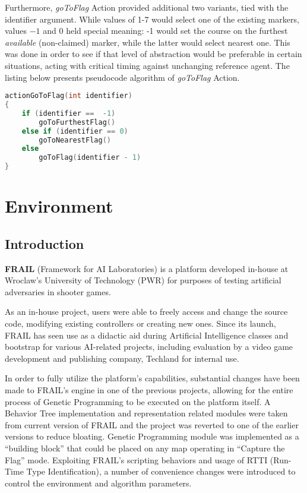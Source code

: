 Furthermore, \textit{goToFlag} Action provided additional two variants, tied with the identifier argument. While values of 1-7 would select one of the existing markers, values $-1$ and $0$ held special meaning: -1 would set the course on the furthest \textit{available} (non-claimed) marker, while the latter would select nearest one. This was done in order to see if that level of abstraction would be preferable in certain situations, acting with critical timing against unchanging reference agent. The listing below presents pseudocode algorithm of \textit{goToFlag} Action.

\begin{lstlisting}[language=C++]
actionGoToFlag(int identifier)
{
    if (identifier ==  -1)
        goToFurthestFlag()
    else if (identifier == 0)
        goToNearestFlag()
    else
        goToFlag(identifier - 1)
}
\end{lstlisting}
\section{Environment}
\subsection{Introduction}
\textbf{FRAIL} (Framework for AI Laboratories) is a platform developed in-house at Wroclaw's University of Technology (PWR) for purposes of testing artificial adversaries in shooter games. \cite{frailweb}

As an in-house project, users were able to freely access and change the source code, modifying existing controllers or creating new ones. Since its launch, FRAIL has seen use as a didactic aid during Artificial Intelligence classes and bootstrap for various AI-related projects, including evaluation by a video game development and publishing company, Techland for internal use. %

In order to fully utilize the platform's capabilities, substantial changes have been made to FRAIL's engine in one of the previous projects, allowing for the entire process of Genetic Programming to be executed on the platform itself. A Behavior Tree implementation and representation related modules were taken from current version of FRAIL and the project was reverted to one of the earlier versions to reduce bloating. Genetic Programming module was implemented as a ``building block'' that could be placed on any map operating in ``Capture the Flag'' mode. Exploiting FRAIL's scripting behaviors and usage of RTTI (Run-Time Type Identification), a number of convenience changes were introduced to control the environment and algorithm parameters.
